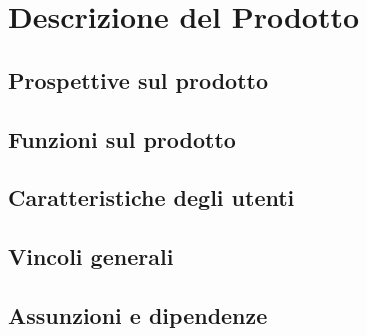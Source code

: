 \section{Descrizione del Prodotto}
	\subsection{Prospettive sul prodotto}
	
	\subsection{Funzioni sul prodotto}
	
	\subsection{Caratteristiche degli utenti}

	\subsection{Vincoli generali}
	
	\subsection{Assunzioni e dipendenze}
	
